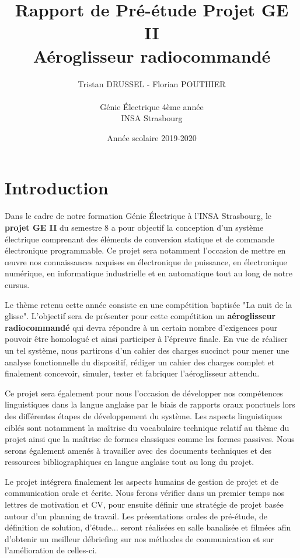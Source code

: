\documentclass[a4paper,12pt]{report}
\title{Rapport de Pré-étude Projet GE II\\Aéroglisseur radiocommandé}
\author{Tristan DRUSSEL - Florian POUTHIER \\ \\ Génie Électrique 4ème année\\ INSA Strasbourg}
\date{Année scolaire 2019-2020}
\begin{document}
	\begin{titlepage}
		\maketitle
	\end{titlepage}
	\tableofcontents
	\newpage
	
	\section{Introduction}
	
	Dans le cadre de notre formation Génie Électrique à l'INSA Strasbourg, le \textbf{projet GE II} du semestre 8 a pour objectif la conception d'un système électrique comprenant des éléments de conversion statique et de commande électronique programmable. Ce projet sera notamment l'occasion de mettre en œuvre nos connaissances acquises en électronique de puissance, en électronique numérique, en informatique industrielle et en automatique tout au long de notre cursus. 
	
	Le thème retenu cette année consiste en une compétition baptisée "La nuit de la glisse". L'objectif sera de présenter pour cette compétition un \textbf{aéroglisseur radiocommandé} qui devra répondre à un certain nombre d'exigences pour pouvoir être homologué et ainsi participer à l'épreuve finale. En vue de réaliser un tel système, nous partirons d'un cahier des charges succinct pour mener une analyse fonctionnelle du dispositif, rédiger un cahier des charges complet et finalement concevoir, simuler, tester et fabriquer l'aéroglisseur attendu.
	
	Ce projet sera également pour nous l'occasion de développer nos compétences linguistiques dans la langue anglaise par le biais de rapports oraux ponctuels lors des différentes étapes de développement du système. Les aspects linguistiques ciblés sont notamment la maîtrise du vocabulaire technique relatif au thème du projet ainsi que la maîtrise de formes classiques comme les formes passives. Nous serons également amenés à travailler avec des documents techniques et des ressources bibliographiques en langue anglaise tout au long du projet.
	
	Le projet intégrera finalement les aspects humains de gestion de projet et de communication orale et écrite. Nous ferons vérifier dans un premier temps nos lettres de motivation et CV, pour ensuite définir une stratégie de projet basée autour d'un planning de travail. Les présentations orales de pré-étude, de définition de solution, d'étude... seront réalisées en salle banalisée et filmées afin d'obtenir un meilleur débriefing sur nos méthodes de communication et sur l'amélioration de celles-ci.
	
\end{document}
